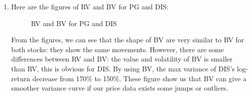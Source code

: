 \documentclass[12pt,letterpaper]{article}
\begin{document}
\begin{enumerate}[label=\textbf{(\Alph*)}]
\item
Here are the figures of RV and BV for PG and DIS:
 \begin{figure}[H]
            \centering
            \caption{RV and BV for PG and DIS}
\end{figure}

From the figures, we can see that the shape of BV are very similar to RV for both stocks: they show the same movements. However, there are some differences between RV and BV: the value and volatility of BV is smaller than RV, this is obvious for DIS. By using BV, the max variance of DIS's log-return decrease from 170\% to 150\%. These figure show us that BV can give a smoother variance curve if our price data exists some jumps or outliers. \\
   

\end{enumerate}
\end{document}
